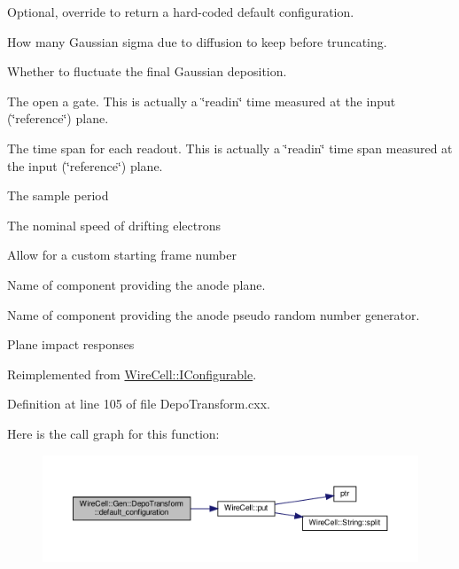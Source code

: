 Optional, override to return a hard-\/coded default configuration. 

How many Gaussian sigma due to diffusion to keep before truncating.

Whether to fluctuate the final Gaussian deposition.

The open a gate. This is actually a \char`\"{}readin\char`\"{} time measured at the input (\char`\"{}reference\char`\"{}) plane.

The time span for each readout. This is actually a \char`\"{}readin\char`\"{} time span measured at the input (\char`\"{}reference\char`\"{}) plane.

The sample period

The nominal speed of drifting electrons

Allow for a custom starting frame number

Name of component providing the anode plane.

Name of component providing the anode pseudo random number generator.

Plane impact responses 

Reimplemented from \hyperlink{class_wire_cell_1_1_i_configurable_a54841b2da3d1ea02189478bff96f7998}{Wire\+Cell\+::\+I\+Configurable}.



Definition at line 105 of file Depo\+Transform.\+cxx.

Here is the call graph for this function\+:
\nopagebreak
\begin{figure}[H]
\begin{center}
\leavevmode
\includegraphics[width=350pt]{class_wire_cell_1_1_gen_1_1_depo_transform_aa3f2c3fcf0aae6b353296fd5d784cb8d_cgraph}
\end{center}
\end{figure}
\mbox{\label{class_wire_cell_1_1_gen_1_1_depo_transform_a3d401800010c7691f3f298ae730eb395}} 
